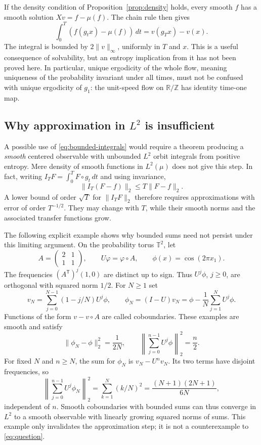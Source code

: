 \documentclass[11pt]{article}
\theoremstyle{definition}
\theoremstyle{remark}
\newcommand{\R}{\mathbb R}
\newcommand{\T}{\mathbb T}
\begin{document}
If the density condition of Proposition~\ref{prop:density} holds, every smooth $f$ has a smooth solution $Xv=f-\mu(f)$. The chain rule then gives
\begin{equation}\label{eq:bounded-integrals}
 \int_0^T(f(g_tx)-\mu(f))\,dt=v(g_Tx)-v(x).
\end{equation}
The integral is bounded by $2\|v\|_\infty$, uniformly in $T$ and $x$. This is a useful consequence of solvability, but an entropy implication from it has not been proved here. In particular, unique ergodicity of the whole flow, meaning uniqueness of the probability invariant under all times, must not be confused with unique ergodicity of $g_1$: the unit-speed flow on $\R/\mathbb Z$ has identity time-one map.

\subsection{Why approximation in \texorpdfstring{$L^2$}{L2} is insufficient}

A possible use of \eqref{eq:bounded-integrals} would require a theorem producing a \emph{smooth} centered observable with unbounded $L^2$ orbit integrals from positive entropy. Mere density of smooth functions in $L^2(\mu)$ does not give this step. In fact, writing $I_TF=\int_0^T F\circ g_t\,dt$ and using invariance,
\[
 \|I_T(F-f)\|_2\le T\|F-f\|_2.
\]
A lower bound of order $\sqrt T$ for $\|I_TF\|_2$ therefore requires approximations with error of order $T^{-1/2}$. They may change with $T$, while their smooth norms and the associated transfer functions grow.

The following explicit example shows why bounded sums need not persist under this limiting argument. On the probability torus $\T^2$, let
\[
 A=\begin{pmatrix}2&1\\1&1\end{pmatrix},\qquad
 U\varphi=\varphi\circ A,\qquad \phi(x)=\cos(2\pi x_1).
\]
The frequencies $(A^{\mathsf T})^j(1,0)$ are distinct up to sign. Thus $U^j\phi$, $j\ge0$, are orthogonal with squared norm $1/2$. For $N\ge1$ set
\[
 v_N=\sum_{j=0}^{N-1}(1-j/N)U^j\phi,\qquad
 \phi_N=(I-U)v_N=\phi-\frac1N\sum_{j=1}^NU^j\phi.
\]
Functions of the form $v-v\circ A$ are called coboundaries. These examples are smooth and satisfy
\[
 \|\phi_N-\phi\|_2^2=\frac1{2N},\qquad
 \left\|\sum_{j=0}^{n-1}U^j\phi\right\|_2^2=\frac n2.
\]
For fixed $N$ and $n\ge N$, the sum for $\phi_N$ is $v_N-U^nv_N$. Its two terms have disjoint frequencies, so
\[
 \left\|\sum_{j=0}^{n-1}U^j\phi_N\right\|_2^2
 =\sum_{k=1}^N(k/N)^2
 =\frac{(N+1)(2N+1)}{6N},
\]
independent of $n$. Smooth coboundaries with bounded sums can thus converge in $L^2$ to a smooth observable with linearly growing squared norms of sums. This example only invalidates the approximation step; it is not a counterexample to \eqref{eq:question}.
\end{document}
